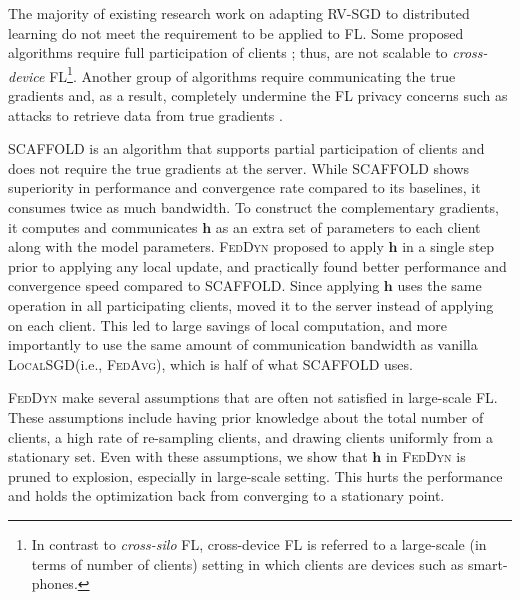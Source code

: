 \documentclass[runningheads]{llncs}
\def\vh{{\bm{h}}}
\newcommand{\fedavg}{\textsc{FedAvg}\xspace}
\newcommand{\scaffold}{\textsc{SCAFFOLD}\xspace}
\newcommand{\feddyn}{\textsc{FedDyn}\xspace}
\newcommand{\localsgd}{\textsc{LocalSGD}\xspace}
\newcommand{\rvsgd}{\textsc{RV-SGD}\xspace}
\begin{document}
The majority of existing research work on adapting \rvsgd to distributed learning do not meet the requirement to be applied to FL.
Some proposed algorithms require full participation of clients \cite{shamir2014communication,reddi2016aide,liang2019variance}; thus, are not scalable to \emph{cross-device} FL\footnote{In contrast to \emph{cross-silo} FL, cross-device FL is referred to a large-scale (in terms of number of clients) setting in which clients are devices such as smart-phones.}.
Another group of algorithms require communicating the true gradients \cite{li2019feddane,murata2021bias} and, as a result, completely undermine the FL privacy concerns such as attacks to retrieve data from true gradients \cite{zhu2020deep}.


\scaffold \cite{karimireddy2020scaffold} is an algorithm that supports partial participation of clients and does not require the true gradients at the server.
While \scaffold shows superiority in performance and convergence rate compared to its baselines, it consumes twice as much bandwidth. 
To construct the complementary gradients, it computes and communicates $\vh$ as an extra set of parameters to each client along with the model parameters.
\feddyn \cite{acar2021federated} proposed to apply $\vh$ in a single step prior to applying any local update, and practically found better performance and convergence speed compared to \scaffold.
Since applying $\vh$ uses the same operation in all participating clients, \cite{acar2021federated} moved it to the server instead of applying on each client.
This led to large savings of local computation, and more importantly to use the same amount of communication bandwidth as vanilla \localsgd (i.e., \fedavg), which is half of what \scaffold uses.


\feddyn make several assumptions that are often not satisfied in large-scale FL.
These assumptions include having prior knowledge about the total number of clients, a high rate of re-sampling clients, and drawing clients uniformly from a stationary set.
Even with these assumptions, we show that $\vh$ in \feddyn is pruned to explosion, especially in large-scale setting. 
This hurts the performance and holds the optimization back from converging to a stationary point.
\end{document}
